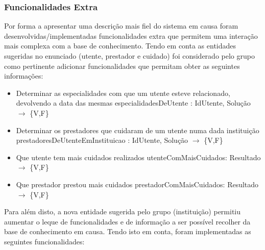 \documentclass{article}
\begin{document}
\subsubsection{Funcionalidades Extra}
Por forma a apresentar uma descrição mais fiel do sistema em causa foram desenvolvidas/implementadas funcionalidades extra que permitem uma interação mais complexa com a base de conhecimento.
\newline
Tendo em conta as entidades sugeridas no enunciado (utente, prestador e cuidado) foi considerado pelo grupo como pertinente adicionar funcionalidades que permitam obter as seguintes informações:
\begin{itemize}
	\item Determinar as especialidades com que um utente esteve relacionado, devolvendo a data das mesmas
\newline
especialidadesDeUtente : IdUtente, Solução $\to$ \{V,F\}
	\item Determinar os prestadores que cuidaram de um utente numa dada instituição
\newline
prestadoresDeUtenteEmInstituicao : IdUtente, Solução $\to$ \{V,F\}
	\item Que utente tem mais cuidados realizados
\newline
utenteComMaisCuidados: Resultado $\to$ \{V,F\}
    \item Que prestador prestou mais cuidados
\newline
prestadorComMaisCuidados: Resultado $\to$ \{V,F\}
\end{itemize}
Para além disto, a nova entidade sugerida pelo grupo (instituição) permitiu aumentar o leque de funcionalidades e de informação a ser possível recolher da base de conhecimento em causa.
\newline
Tendo isto em conta, foram implementadas as seguintes funcionalidades:
\end{document}

